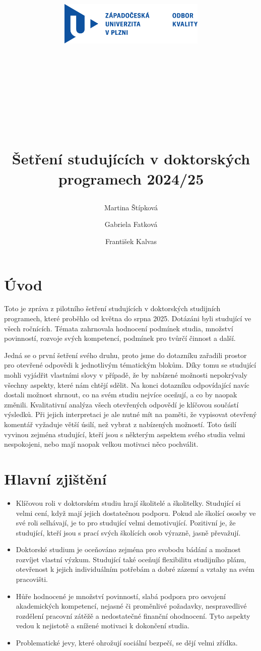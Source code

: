 \documentclass[
  czech,
  14pt,
  a4paper,
  DIV=11,
  numbers=noendperiod]{scrreprt}
\title{\includegraphics[width=7cm,height=\textheight,keepaspectratio]{odbor_kvality.png}\\
\strut \\
\strut \\
\strut \\
Šetření studujících v doktorských programech 2024/25}
\author{Martina Štípková \and Gabriela Fatková \and František Kalvas}
\date{}
\renewcommand*\contentsname{Obsah}
\newcommand\contentsname{Obsah}
\begin{document}
\maketitle

\renewcommand*\contentsname{Obsah}
{
\hypersetup{linkcolor=}
\setcounter{tocdepth}{2}
\tableofcontents
}

\chapter{Úvod}\label{uxfavod}

Toto je zpráva z pilotního šetření studujících v doktorských studijních
programech, které proběhlo od května do srpna 2025. Dotázáni byli
studující ve všech ročnících. Témata zahrnovala hodnocení podmínek
studia, množství povinností, rozvoje svých kompetencí, podmínek pro
tvůrčí činnost a další.

Jedná se o první šetření svého druhu, proto jsme do dotazníku zařadili
prostor pro otevřené odpovědi k jednotlivým tématickým blokům. Díky tomu
se studující mohli vyjádřit vlastními slovy v případě, že by nabízené
možnosti nepokrývaly všechny aspekty, které nám chtějí sdělit. Na konci
dotazníku odpovídající navíc dostali možnost shrnout, co na svém studiu
nejvíce oceňují, a co by naopak změnili. Kvalitativní analýza všech
otevřených odpovědí je klíčovou součástí výsledků. Při jejich
interpretaci je ale nutné mít na paměti, že vypisovat otevřený komentář
vyžaduje větší úsilí, než vybrat z nabízených možností. Toto úsilí
vyvinou zejména studující, kteří jsou s některým aspektem svého studia
velmi nespokojeni, nebo mají naopak velkou motivaci něco pochválit.

\chapter{Hlavní zjištění}\label{hlavnuxed-zjiux161tux11bnuxed}

\begin{itemize}
\item
  Klíčovou roli v doktorském studiu hrají školitelé a školitelky.
  Studující si velmi cení, když mají jejich dostatečnou podporu. Pokud
  ale školící ososby ve své roli selhávají, je to pro studující velmi
  demotivující. Pozitivní je, že studující, kteří jsou s prací svých
  školících osob výrazně, jasně převažují.
\item
  Doktorské studium je oceňováno zejména pro svobodu bádání a možnost
  rozvíjet vlastní výzkum. Studující také oceňují flexibilitu studijního
  plánu, otevřenost k jejich individuálním potřebám a dobré zázemí a
  vztahy na svém pracovišti.
\item
  Hůře hodnocené je množství povinností, slabá podpora pro osvojení
  akademických kompetencí, nejasné či proměnlivé požadavky,
  nespravedlivé rozdělení pracovní zátěžě a nedostatečné finanční
  ohodnocení. Tyto aspekty vedou k nejistotě a snížené motivaci k
  dokončení studia.
\item
  Problematické jevy, které ohrožují sociální bezpečí, se dějí velmi
  zřídka.
\end{itemize}
\end{document}
